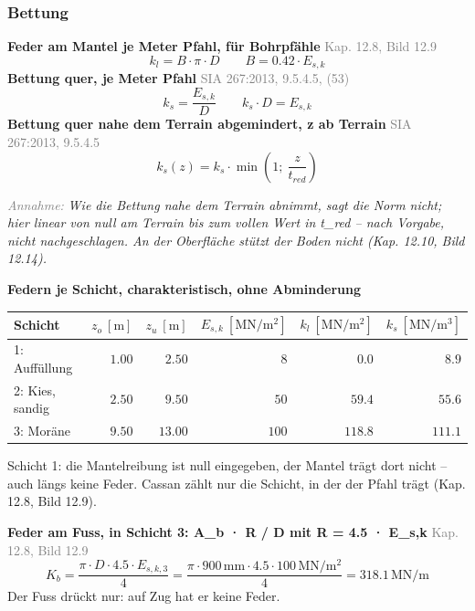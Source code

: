 \documentclass[11pt,a4paper]{article}
\newcommand{\normref}[1]{{\small\textcolor{gray}{#1}}}
\newcommand{\hinweis}[2]{\par\noindent\textcolor{gray}{\textit{#1:}} \textit{#2}\par}
\begin{document}
\subsubsection{Bettung}
\noindent\textbf{Feder am Mantel je Meter Pfahl, für Bohrpfähle} \hfill \normref{Kap. 12.8, Bild 12.9}
\begin{equation*}
k_l = B \cdot \pi \cdot D \qquad B = 0.42 \cdot E_{s,k}
\end{equation*}
\noindent\textbf{Bettung quer, je Meter Pfahl} \hfill \normref{SIA 267:2013, 9.5.4.5, (53)}
\begin{equation*}
k_s = \frac{E_{s,k}}{D} \qquad k_s \cdot D = E_{s,k}
\end{equation*}
\noindent\textbf{Bettung quer nahe dem Terrain abgemindert, z ab Terrain} \hfill \normref{SIA 267:2013, 9.5.4.5}
\begin{equation*}
k_s(z) = k_s \cdot \min\left(1;\ \frac{z}{t_{red}}\right)
\end{equation*}
\hinweis{Annahme}{Wie die Bettung nahe dem Terrain abnimmt, sagt die Norm nicht; hier linear von null am Terrain bis zum vollen Wert in t\_red -- nach Vorgabe, nicht nachgeschlagen. An der Oberfläche stützt der Boden nicht (Kap. 12.10, Bild 12.14).}
\noindent\textbf{Federn je Schicht, charakteristisch, ohne Abminderung}
\begin{longtable}{lrrrrr}
\hline
Schicht & $z_o\ [\mathrm{m}]$ & $z_u\ [\mathrm{m}]$ & $E_{s,k}\ [\mathrm{MN/m^2}]$ & $k_l\ [\mathrm{MN/m^2}]$ & $k_s\ [\mathrm{MN/m^3}]$ \\
\hline
\endhead
1: Auffüllung & $1.00$ & $2.50$ & $8$ & $0.0$ & $8.9$ \\
2: Kies, sandig & $2.50$ & $9.50$ & $50$ & $59.4$ & $55.6$ \\
3: Moräne & $9.50$ & $13.00$ & $100$ & $118.8$ & $111.1$ \\
\hline
\end{longtable}
Schicht 1: die Mantelreibung ist null eingegeben, der Mantel trägt dort nicht -- auch längs keine Feder. Cassan zählt nur die Schicht, in der der Pfahl trägt (Kap. 12.8, Bild 12.9).

\noindent\textbf{Feder am Fuss, in Schicht 3: A\_b · R / D mit R = 4.5 · E\_s,k} \hfill \normref{Kap. 12.8, Bild 12.9}
\begin{equation*}
K_b = \frac{\pi \cdot D \cdot 4.5 \cdot E_{s,k,3}}{4} = \frac{\pi \cdot 900\,\mathrm{mm} \cdot 4.5 \cdot 100\,\mathrm{MN}/\mathrm{m}^{2}}{4} = 318.1\,\mathrm{MN}/\mathrm{m}
\end{equation*}
Der Fuss drückt nur: auf Zug hat er keine Feder.
\end{document}
